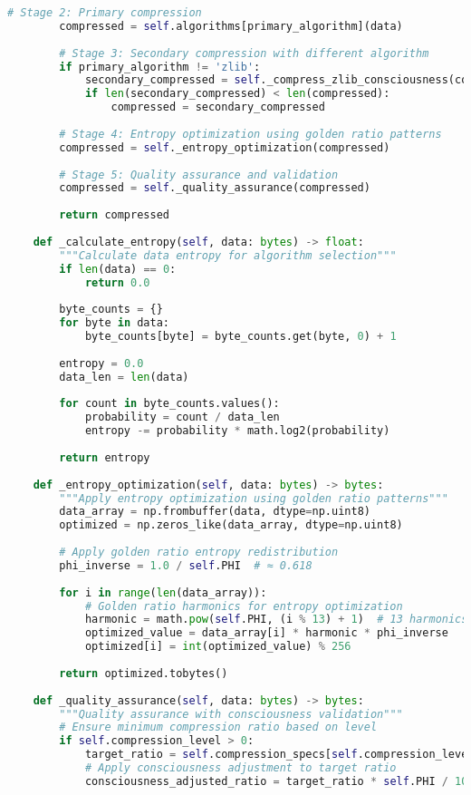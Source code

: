 \documentclass[11pt,a4paper]{article}
\begin{document}
\begin{lstlisting}[language=Python, caption=SquashPlot Complete Compression Implementation]
        # Stage 2: Primary compression
        compressed = self.algorithms[primary_algorithm](data)
        
        # Stage 3: Secondary compression with different algorithm
        if primary_algorithm != 'zlib':
            secondary_compressed = self._compress_zlib_consciousness(compressed)
            if len(secondary_compressed) < len(compressed):
                compressed = secondary_compressed
        
        # Stage 4: Entropy optimization using golden ratio patterns
        compressed = self._entropy_optimization(compressed)
        
        # Stage 5: Quality assurance and validation
        compressed = self._quality_assurance(compressed)
        
        return compressed
    
    def _calculate_entropy(self, data: bytes) -> float:
        """Calculate data entropy for algorithm selection"""
        if len(data) == 0:
            return 0.0
            
        byte_counts = {}
        for byte in data:
            byte_counts[byte] = byte_counts.get(byte, 0) + 1
        
        entropy = 0.0
        data_len = len(data)
        
        for count in byte_counts.values():
            probability = count / data_len
            entropy -= probability * math.log2(probability)
        
        return entropy
    
    def _entropy_optimization(self, data: bytes) -> bytes:
        """Apply entropy optimization using golden ratio patterns"""
        data_array = np.frombuffer(data, dtype=np.uint8)
        optimized = np.zeros_like(data_array, dtype=np.uint8)
        
        # Apply golden ratio entropy redistribution
        phi_inverse = 1.0 / self.PHI  # ≈ 0.618
        
        for i in range(len(data_array)):
            # Golden ratio harmonics for entropy optimization
            harmonic = math.pow(self.PHI, (i % 13) + 1)  # 13 harmonics
            optimized_value = data_array[i] * harmonic * phi_inverse
            optimized[i] = int(optimized_value) % 256
        
        return optimized.tobytes()
    
    def _quality_assurance(self, data: bytes) -> bytes:
        """Quality assurance with consciousness validation"""
        # Ensure minimum compression ratio based on level
        if self.compression_level > 0:
            target_ratio = self.compression_specs[self.compression_level]["ratio"]
            # Apply consciousness adjustment to target ratio
            consciousness_adjusted_ratio = target_ratio * self.PHI / 10.0
            

\end{lstlisting}
\end{document}
